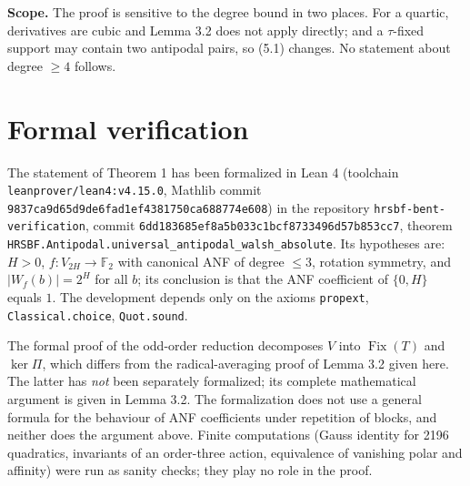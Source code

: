 \documentclass[11pt,reqno]{amsart}
\begin{document}
\textbf{Scope.} The proof is sensitive to the degree bound in two places. For a quartic, derivatives are cubic and Lemma 3.2 does not apply directly; and a $\tau$-fixed support may contain two antipodal pairs, so (5.1) changes. No statement about degree $\ge4$ follows.


\section{Formal verification}

The statement of Theorem 1 has been formalized in Lean 4 (toolchain \nolinkurl{leanprover/lean4:v4.15.0}, Mathlib commit \nolinkurl{9837ca9d65d9de6fad1ef4381750ca688774e608}) in the repository \nolinkurl{hrsbf-bent-verification}, commit \nolinkurl{6dd183685ef8a5b033c1bcf8733496d57b853cc7}, theorem \nolinkurl{HRSBF.Antipodal.universal_antipodal_walsh_absolute}. Its hypotheses are: $H>0$, $f:V_{2H}\to\mathbb F_2$ with canonical ANF of degree $\le3$, rotation symmetry, and $|W_f(b)|=2^H$ for all $b$; its conclusion is that the ANF coefficient of $\{0,H\}$ equals $1$. The development depends only on the axioms \nolinkurl{propext}, \nolinkurl{Classical.choice}, \nolinkurl{Quot.sound}.

The formal proof of the odd-order reduction decomposes $V$ into $\operatorname{Fix}(T)$ and $\ker\Pi$, which differs from the radical-averaging proof of Lemma 3.2 given here. The latter has \emph{not} been separately formalized; its complete mathematical argument is given in Lemma 3.2. The formalization does not use a general formula for the behaviour of ANF coefficients under repetition of blocks, and neither does the argument above. Finite computations (Gauss identity for 2196 quadratics, invariants of an order-three action, equivalence of vanishing polar and affinity) were run as sanity checks; they play no role in the proof.
\end{document}
